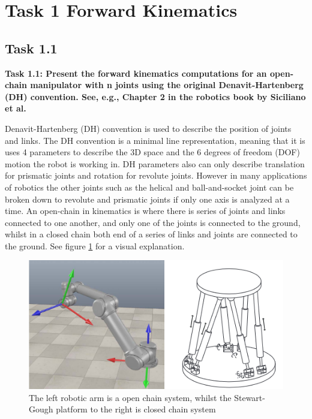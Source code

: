 \section{Task 1 Forward Kinematics}
\subsection{Task 1.1}
\label{title:Task1.1}


\textbf{Task 1.1: Present the forward kinematics computations for an open-chain manipulator with n joints using the original Denavit-Hartenberg (DH) convention. See, e.g., Chapter 2 in the robotics book by Siciliano et al.}

Denavit-Hartenberg (DH) convention is used to describe the position of joints and links. The DH convention is a minimal line representation, meaning that it is uses 4 parameters to describe the 3D space and the 6 degrees of freedom (DOF) motion the robot is working in. DH parameters also can only describe translation for prismatic joints and rotation for revolute joints. However in many applications of robotics the other joints such as the helical and ball-and-socket joint can be broken down to revolute and prismatic joints if only one axis is analyzed at a time. An open-chain in kinematics is where there is series of joints and links connected to one another, and only one of the joints is connected to the ground, whilst in a closed chain both end of a series of links and joints are connected to the ground. See figure \ref{fig:openvsclosed} for a visual explanation.

\begin{figure} [H]
    \centering
    \includegraphics{Images/Task1.1&1.2/openvsclosed.png}
    \caption{The left robotic arm is a open chain system, whilst the Stewart-Gough platform to the right is closed chain system}
    \label{fig:openvsclosed}
\end{figure}

